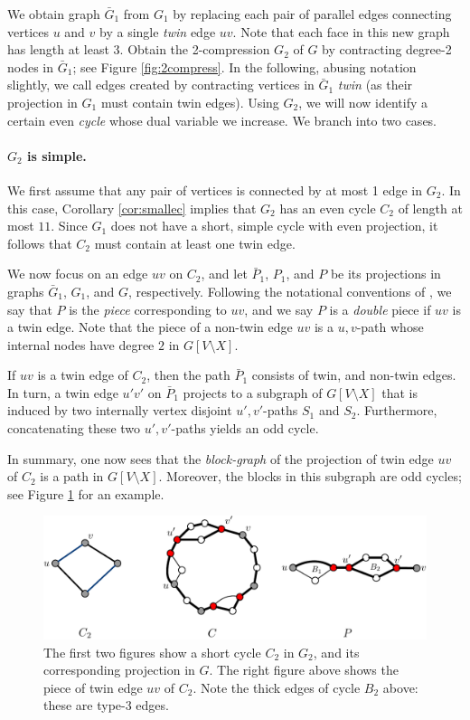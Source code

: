 \documentclass{article}
\newcommand{\0}{\mathbb{0}}
\newcommand{\1}{\mathbb{1}}
\begin{document}
We obtain graph $\bar{G}_1$ from $G_1$ by replacing each pair of parallel edges
connecting vertices $u$ and $v$ by a single {\em twin} edge $uv$.
Note that each face in this new graph has length at least 3.
Obtain the 2-compression $G_2$ of
$G$ by contracting degree-2 nodes in $\bar{G}_1$; see Figure
\ref{fig:2compress}. In the following, abusing notation slightly, we
call edges created by contracting vertices in $\bar{G}_1$ {\em
twin} (as their projection in $G_1$ must contain twin edges). Using $G_2$, we will now
identify a certain even {\em cycle} whose dual variable we increase. 
We branch into two
cases. 

\paragraph{$G_2$ is simple.}

We first assume that any pair of vertices is connected by at most 1 edge in $G_2$. 
In this case, Corollary \ref{cor:smallec} implies that $G_2$ has an even cycle $C_2$ 
of length at most $11$. Since $G_1$ does not have a short, simple cycle with even
projection, it follows that $C_2$ must contain at least one twin edge.

We now focus on an edge $uv$ on $C_2$, and let $\bar{P}_1$, $P_1$, and $P$
be its projections in graphs $\bar{G}_1$, $G_1$, and $G$, respectively.  
Following the notational conventions of 
\cite{FJP10}, we say that $P$ is the {\em piece} corresponding to $uv$, and we say $P$ is a \emph{double} piece if $uv$ is a twin edge. 
Note that the piece of a non-twin edge $uv$ is a $u,v$-path whose
internal nodes have degree $2$ in $G[V\setminus X]$.

If $uv$ is a twin edge of $C_2$, then the path $\bar{P}_1$ consists of twin, and non-twin
edges. In turn, a twin edge $u'v'$ on $\bar{P}_1$ projects to a
subgraph of $G[V \setminus X]$ that is induced by two internally vertex
disjoint $u',v'$-paths $S_1$ and $S_2$. Furthermore, concatenating these two
$u',v'$-paths yields an odd cycle. 

In summary, one now sees that
the {\em block-graph} of the projection of twin edge $uv$ of $C_2$ is 
a path in $G[V\setminus X]$. Moreover, the
blocks in this subgraph are odd cycles; see Figure \ref{fig:cycG2} for
an example.

\begin{figure}[b]
  \begin{center}
    \includegraphics[width=.8\textwidth]{cycG2.pdf}
  \end{center}
  \caption{\label{fig:cycG2}The first two figures show a  short cycle $C_2$ in $G_2$, and its
    corresponding projection in $G$. The right figure above shows the piece
    of twin edge $uv$ of $C_2$. Note the thick edges of cycle $B_2$ above: these
    are type-3 edges.}
\end{figure}
\end{document}
